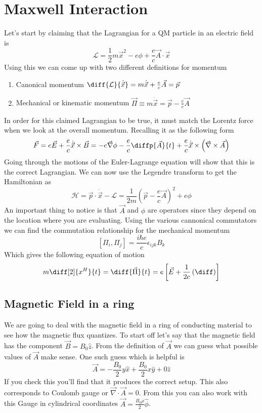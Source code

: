 \section{Maxwell Interaction}
Let's start by claiming that the Lagrangian for a QM particle in an electric field is
$$
    \mathcal{L} = \frac{1}{2} m \vec{x}^2 - e \phi + \frac{e}{c} \vec{A} \cdot \vec{x}
$$
Using this we can come up with two different definitions for momentum
\begin{enumerate}
    \item Canonical momentum 
        $\diff{{\mathcal{L}}}{{\dot{\vec{x}}}} = m \dot{\vec{x}} + \frac{e}{c} \vec{A} = \vec{p}$
    \item Mechanical or kinematic momentum
        $\vec{\Pi} \equiv m \dot{\vec{x}} = \vec{p} - \frac{e}{c} \vec{A}$
\end{enumerate}
In order for this claimed Lagrangian to be true, it must match the Lorentz force when we look 
at the overall momentum. Recalling it as the following form
$$
    \vec{F} = e \vec{E} + \frac{e}{c} \dot{\vec{x}} \times \vec{B} =
    -e \vec{\nabla}\phi - \frac{e}{c} \diffp{{\vec{A}}}{t} + 
    \frac{e}{c} \dot{\vec{x}} \times \left(\vec{\nabla} \times \vec{A}\right)
$$
Going through the motions of the Euler-Lagrange equation will show that this is the correct
Lagrangian. We can now use the Legendre transform to get the Hamiltonian as
$$
    \mathcal{H} = \vec{p}\cdot\dot{\vec{x}} - \mathcal{L} =
    \frac{1}{2m} \left(\vec{p} - \frac{e}{c} \vec{A}\right)^2 + e \phi
$$
An important thing to notice is that $\vec{A}$ and $\phi$ are operators since they depend
on the location where you are evaluating. Using the various cannonical commutators we can find
the commutation relationship for the mechanical momentum
$$
\left[\Pi_i, \Pi_j\right] = \frac{i\hbar e}{c} \epsilon_{ijk} B_k
$$
Which gives the following equation of motion
$$
    m \diff[2]{{x^H}}{t} = \diff{\vec{\Pi}}{t} =
    e \left[\vec{E} + \frac{1}{2c}
    \left(\diff\right)\right]
$$

\subsection{Magnetic Field in a ring}
We are going to deal with the magnetic field in a ring of conducting material to see how the
magnetic flux quantizes. To start off let's say that the magnetic field has the component
$\vec{B} = B_0 \hat{z}$. From the definition of $\vec{A}$ we can guess what possible values
of $\vec{A}$ make sense. One such guess which is helpful is
$$
    \vec{A} = - \frac{B_0}{2} y \hat{x} + \frac{B_0}{2} x \hat{y} + 0 \hat{z}
$$
If you check this you'll find that it produces the correct setup. This also corresponds to
{\color{red} Coulomb gauge} or $\vec{\nabla}\cdot \vec{A} = 0$. From this you can also work
with this Gauge in cylindrical coordinates $\vec{A} = \frac{B_0 \rho}{2} \hat{\phi}$.
